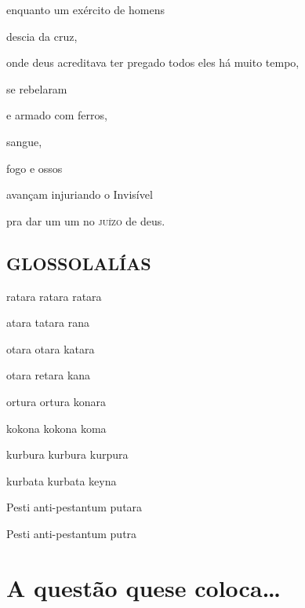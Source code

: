enquanto um exército de homens

descia da cruz, 

onde deus acreditava ter pregado todos eles há muito tempo,

se rebelaram

e armado com ferros,

sangue,

fogo e ossos

avançam injuriando o Invisível

pra dar um um no \textsc{juízo} de deus.



\pagebreak
\vspace*{\fill}
\section*{GLOSSOLALÍAS}
\vspace*{\fill}
\begin{center}
ratara ratara ratara
\vspace*{\fill}

atara tatara rana
\vspace*{\fill}

otara otara katara
\vspace*{\fill}

otara retara kana
\vspace*{\fill}

ortura ortura konara
\vspace*{\fill}

kokona kokona koma
\vspace*{\fill}

kurbura kurbura kurpura
\vspace*{\fill}

kurbata kurbata keyna
\vspace*{\fill}

Pesti anti-pestantum putara
\vspace*{\fill}

Pesti anti-pestantum putra
\end{center}
\vspace*{\fill}

\chapter[A questão que se coloca\ldots{}]{A questão que\break se coloca\ldots{}}

